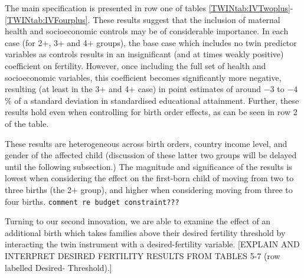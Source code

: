 The main specification is presented in row one of tables 
\ref{TWINtab:IVTwoplus}-\ref{TWINtab:IVFourplus}.  These results suggest that
the inclusion of maternal health and socioeconomic controls may be of 
considerable importance.  In each case (for 2+, 3+ and 4+ groups), the base
case which includes no twin predictor variables as controls results in an 
insignificant (and at times weakly positive) coefficient on fertility.  However,
once including the full set of health and socioeconomic variables, this 
coefficient becomes significantly more negative, resulting (at least in the
3+ and 4+ case) in point estimates of around $-3$ to $-4$\% of a standard deviation
in standardised educational attainment.  Further, these results hold even when
controlling for birth order effects, as can be seen in row 2 of the table.

These results are heterogeneous across birth orders, country income level, and
gender of the affected child (discussion of these latter two groups will be
delayed until the following subsection.)  The magnitude and significance of the 
results is lowest when considering the effect on the first-born child of moving 
from two to three births (the 2+ group), and higher when considering moving from
three to four births.  \texttt{comment re budget constraint???}

Turning to our second innovation, we are able to examine the effect of an
additional birth which takes families above their desired fertility threshold
by interacting the twin instrument with a desired-fertility variable. [EXPLAIN
AND INTERPRET DESIRED FERTILITY RESULTS FROM TABLES 5-7 (row labelled Desired-%
Threshold).]   

